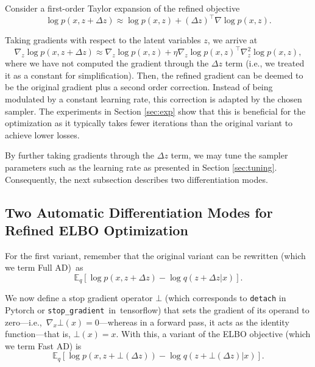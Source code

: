 Consider a first-order Taylor expansion of the refined objective 
$$
\log p(x, z + \Delta z) \approx \log p(x, z) + (\Delta z)^\intercal \nabla \log p(x, z).
$$

Taking gradients %
with respect to the latent variables $z$, we arrive at
$$
\nabla_z \log p(x, z + \Delta z) \approx \nabla_z \log p(x,z) + \eta \nabla_z \log p(x,z)^\intercal \nabla_z^2 \log p(x,z),
$$
where we have not computed the gradient through the $\Delta z$ term (i.e., we treated it as a constant for simplification). Then, the refined gradient can be deemed to be the original gradient plus a second order correction. Instead of being modulated by a constant learning rate, this correction is adapted by the chosen sampler. The experiments in Section \ref{sec:exp} 
show that this is beneficial for the optimization as it 
typically takes fewer iterations than the original variant to achieve lower losses. 

By further taking gradients through the $\Delta z$ term, we may tune the sampler parameters such as the learning rate as 
presented in Section \ref{sec:tuning}. Consequently, the next subsection describes two 
differentiation modes.


\subsection{Two Automatic Differentiation Modes for Refined ELBO Optimization}\label{sec:AD}

For the first variant, 
remember that the original variant can be 
rewritten (which we term Full AD)~as
\begin{equation}
     \mathbb{E}_q \left[ \log p(x, z + \Delta z) - \log q(z + \Delta z | x) \right].
\end{equation}



We now define a stop gradient operator $\bot$ (which corresponds to \texttt{detach} in Pytorch or \linebreak \texttt{stop\_gradient}~in~tensorflow)  that sets the gradient of its operand to zero---i.e.,~$\nabla_x \bot (x) = 0$---whereas in a forward pass, it acts as the identity function---that is, $\bot (x) = x$. With this, a variant  of the ELBO objective (which we term Fast AD) is
\begin{equation}
    \mathbb{E}_q \left[ \log p(x, z + \bot (\Delta z)) - \log q(z + \bot(\Delta z) | x) \right].
\end{equation}

